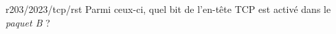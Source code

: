 \begin{question}{r203/2023/tcp/rst}
  Parmi ceux-ci, quel bit de l'en-tête TCP est activé dans le {\em
    paquet B} ?
  \begin{reponses}
  \end{reponses}
\end{question}
